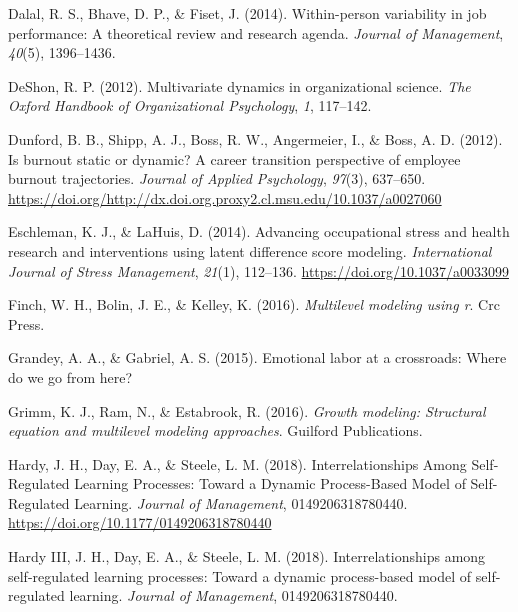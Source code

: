 \documentclass[english,,man]{apa6}
\begin{document}
\leavevmode\hypertarget{ref-dalal2014within}{}%
Dalal, R. S., Bhave, D. P., \& Fiset, J. (2014). Within-person variability in job performance: A theoretical review and research agenda. \emph{Journal of Management}, \emph{40}(5), 1396--1436.

\leavevmode\hypertarget{ref-deshon_multivariate_2012}{}%
DeShon, R. P. (2012). Multivariate dynamics in organizational science. \emph{The Oxford Handbook of Organizational Psychology}, \emph{1}, 117--142.

\leavevmode\hypertarget{ref-dunford_is_2012}{}%
Dunford, B. B., Shipp, A. J., Boss, R. W., Angermeier, I., \& Boss, A. D. (2012). Is burnout static or dynamic? A career transition perspective of employee burnout trajectories. \emph{Journal of Applied Psychology}, \emph{97}(3), 637--650. \url{https://doi.org/http://dx.doi.org.proxy2.cl.msu.edu/10.1037/a0027060}

\leavevmode\hypertarget{ref-eschleman_advancing_2014}{}%
Eschleman, K. J., \& LaHuis, D. (2014). Advancing occupational stress and health research and interventions using latent difference score modeling. \emph{International Journal of Stress Management}, \emph{21}(1), 112--136. \url{https://doi.org/10.1037/a0033099}

\leavevmode\hypertarget{ref-finch2016multilevel}{}%
Finch, W. H., Bolin, J. E., \& Kelley, K. (2016). \emph{Multilevel modeling using r}. Crc Press.

\leavevmode\hypertarget{ref-grandey2015emotional}{}%
Grandey, A. A., \& Gabriel, A. S. (2015). Emotional labor at a crossroads: Where do we go from here?

\leavevmode\hypertarget{ref-grimm_growth_2016}{}%
Grimm, K. J., Ram, N., \& Estabrook, R. (2016). \emph{Growth modeling: Structural equation and multilevel modeling approaches}. Guilford Publications.

\leavevmode\hypertarget{ref-hardy_interrelationships_2018}{}%
Hardy, J. H., Day, E. A., \& Steele, L. M. (2018). Interrelationships Among Self-Regulated Learning Processes: Toward a Dynamic Process-Based Model of Self-Regulated Learning. \emph{Journal of Management}, 0149206318780440. \url{https://doi.org/10.1177/0149206318780440}

\leavevmode\hypertarget{ref-hardy2018}{}%
Hardy III, J. H., Day, E. A., \& Steele, L. M. (2018). Interrelationships among self-regulated learning processes: Toward a dynamic process-based model of self-regulated learning. \emph{Journal of Management}, 0149206318780440.
\end{document}
